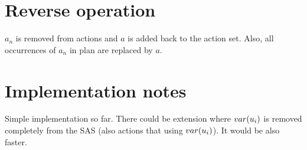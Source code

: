 	
	\section{Reverse operation}
	$a_n$ is removed from actions and $a$ is added back to the action set. Also, all occurrences of $a_n$ in plan are replaced by $a$.
		
	\section{Implementation notes}
	Simple implementation so far. There could be extension where $var(u_i)$ is removed completely from the SAS (also actions that using $var(u_i)$). It would be also faster.
	
	
	
	
	
	